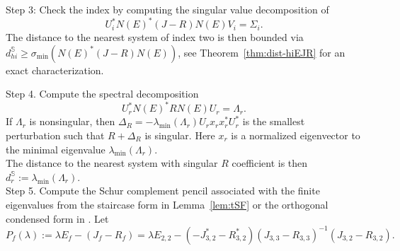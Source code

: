 \documentclass[11pt]{article}
\begin{document}
Step 3: Check the index by computing the singular value decomposition of
\[
U^*_iN(E)^*(J-R) N(E)V_i=\Sigma_i.
\]
The distance to the nearest system of index two is then bounded via $d_{hi}^{\mathbb S}\geq \sigma_{\min}(N(E)^* (J-R) N(E))$, see Theorem~\ref{thm:dist-hiEJR} for an exact characterization.



Step 4. Compute the spectral decomposition
%
\[
U_r^*N(E)^*RN(E)U_r=\Lambda_r.
\]
If $\Lambda_r$ is nonsingular, then  $\Delta_R=-\lambda_{\min} (\Lambda_r) U_rx_r x_r^*U_r^*$ is the smallest perturbation such that $R+\Delta_R$ is singular. Here $x_r$ is a normalized eigenvector to the minimal eigenvalue $\lambda_{\min}(\Lambda_r)$.\\
The distance to the nearest system with singular $R$ coefficient is then $d_r^{\mathbb S}:=\lambda_{\min}(\Lambda_r)$.\\

Step 5. Compute the Schur complement pencil associated with the finite eigenvalues
from the staircase form  in Lemma~\ref{lem:tSF} or the orthogonal condensed form in \cite{MehX15}. Let
%
\[
P_f(\lambda):=\lambda E_f-(J_f-R_f)=\lambda E_{2,2}- (-J_{3,2}^*-R_{3,2}^*)(J_{3,3}-R_{3,3})^{-1} (J_{3,2}-R_{3,2}).
\]
%
\end{document}
